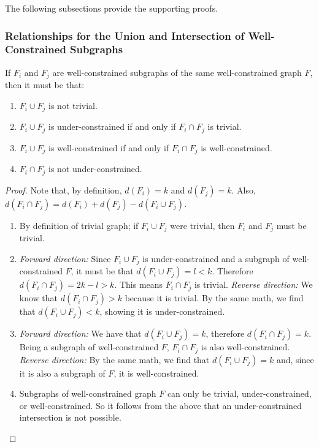 The following subsections provide the supporting proofs.




\subsubsection{Relationships for the Union and Intersection of Well-Constrained Subgraphs}
\label{sec:union_intersection}

\begin{remark}\label{lemma:union_intersection}
If $F_i$ and $F_j$ are well-constrained subgraphs of the same well-constrained graph $F$, then it must be that:
\begin{enumerate}
    \item $F_i\cup F_j$ is not trivial.
    \item $F_i\cup F_j$ is under-constrained if and only if $F_i\cap F_j$ is trivial.
    \item $F_i\cup F_j$ is well-constrained if and only if $F_i\cap F_j$ is well-constrained.
    \item $F_i\cap F_j$ is not under-constrained.
\end{enumerate}
\end{remark}

\begin{proof}
Note that, by definition, $d(F_i)=k$ and $d(F_j)=k$. Also, $d(F_i\cap F_j)=d(F_i)+d(F_j)-d(F_i\cup F_j)$.
\begin{enumerate}
    \item By definition of trivial graph; if $F_i\cup F_j$ were trivial, then $F_i$ and $F_j$ must be trivial.

    \item \textit{Forward direction:} Since $F_i\cup F_j$ is under-constrained and a subgraph of well-constrained $F$, it must be that $d(F_i\cup F_j)=l<k$. Therefore $d(F_i\cap F_j)=2k-l>k$. This means $F_i\cap F_j$ is trivial. \textit{Reverse direction:} We know that $d(F_i\cap F_j)>k$ because it is trivial. By the same math, we find that $d(F_i\cup F_j)<k$, showing it is under-constrained.

    \item \textit{Forward direction:} We have that $d(F_i\cup F_j)=k$, therefore $d(F_i\cap F_j)=k$. Being a subgraph of well-constrained $F$, $F_i\cap F_j$ is also well-constrained. \textit{Reverse direction:} By the same math, we find that $d(F_i\cup F_j)=k$ and, since it is also a subgraph of $F$, it is well-constrained.

    \item Subgraphs of well-constrained graph $F$ can only be trivial, under-constrained, or well-constrained. So it follows from the above that an under-constrained intersection is not possible.
\end{enumerate}
\end{proof}





